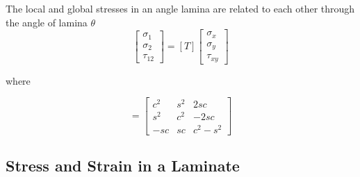 \documentclass[smallextended]{svjour3}       %
\begin{document}
The local and global stresses in an angle lamina are related to each other through the angle of
lamina $\theta$
\begin{equation}
	\left[\begin{array}{l}\sigma_{1} \\ \sigma_{2} \\ \tau_{12
			}\end{array}\right]=[T]\left[\begin{array}{l}\sigma_{x} \\ \sigma_{y} \\
	\tau_{xy}\end{array}\right]
\end{equation}

where 

\begin{equation}
	[T]=\left[\begin{array}{ccc}c^{2} & s^{2} & 2 s c \\ s^{2} & c^{2} & -2 s c \\ -s c & s c &
	c^{2}-s^{2}\end{array}\right] 
\end{equation}

\subsection{Stress and Strain in a Laminate}
\end{document}
